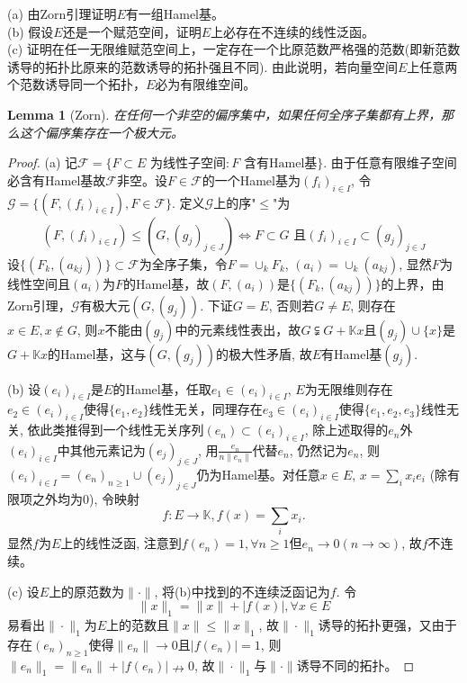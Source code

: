 \documentclass[a4paper,8pt]{ctexart}\textwidth 140mm \textheight 216mm
\newtheorem{Lemma}{Lemma}[section]
\newcommand{\F}{{\mathcal F}}
\newcommand{\8}{\infty}
\begin{document}
\noindent (a) 由Zorn引理证明$E$有一组Hamel基。\\
\noindent (b) 假设$E$还是一个赋范空间，证明$E$上必存在不连续的线性泛函。\\
\noindent (c) 证明在任一无限维赋范空间上，一定存在一个比原范数严格强的范数(即新范数诱导的拓扑比原来的范数诱导的拓扑强且不同). 由此说明，若向量空间$E$上任意两个范数诱导同一个拓扑，$E$必为有限维空间。
\begin{Lemma}[Zorn]
	在任何一个非空的偏序集中，如果任何全序子集都有上界，那么这个偏序集存在一个极大元。
\end{Lemma}
\begin{proof}
	(a) 记$\mathcal{F}=\{F\subset E\text{ 为线性子空间}:F\text{ 含有Hamel基}\}$. 由于任意有限维子空间必含有Hamel基故$\mathcal{F}$非空。设$F\in\mathcal{F}$的一个Hamel基为$(f_i)_{i\in I}$, 令$\mathcal{G}=\{(F,(f_i)_{i\in I}),F\in \mathcal{F}\}$. 定义$\mathcal{G}$上的序"$\leq$"为
	\begin{equation*}
	(F,(f_i)_{i\in I})\leq (G,(g_j)_{j\in J})\Leftrightarrow F\subset G\text{ 且}(f_i)_{i\in I}\subset (g_j)_{j\in J}
	\end{equation*}
	设$\{(F_k, (a_{kj}))\}\subset \F$为全序子集，令$F=\cup_{k}F_k$, $(a_i)=\cup_{k}(a_{kj})$, 显然$F$为线性空间且$(a_i)$为$F$的Hamel基，故$(F,(a_i))$是$\{(F_k, (a_{kj}))\}$的上界，由Zorn引理，$\mathcal{G}$有极大元$(G,(g_j))$. 下证$G=E$, 否则若$G\neq E$, 则存在$x\in E, x\notin G$, 则$x$不能由$(g_j)$中的元素线性表出，故$G\subsetneqq G+\mathbb{K}x$且$(g_j)\cup\{x\}$是$G+\mathbb{K}x$的Hamel基，这与$(G,(g_j))$的极大性矛盾, 故$E$有Hamel基$(g_j)$.
	
	(b) 设$(e_i)_{i\in I}$是$E$的Hamel基，任取$e_1\in(e_i)_{i\in I}$, $E$为无限维则存在$e_2\in(e_i)_{i\in I}$使得$\{e_1,e_2\}$线性无关，同理存在$e_3\in(e_i)_{i\in I}$使得$\{e_1,e_2, e_3\}$线性无关, 依此类推得到一个线性无关序列$(e_n)\subset (e_i)_{i\in I}$, 除上述取得的$e_n$外$(e_i)_{i\in I}$中其他元素记为$(e_j)_{j\in J}$, 用$\frac{e_n}{n\|e_n\|}$代替$e_n$, 仍然记为$e_n$, 则$(e_i)_{i\in I}=(e_n)_{n\geq 1}\cup (e_j)_{j\in J}$仍为Hamel基。对任意$x\in E$, $x=\sum_ix_ie_i$ (除有限项之外均为0), 令映射
	\begin{equation*}
	f:E\to \mathbb{K}, f(x)=\sum_i x_i.
	\end{equation*}
	显然$f$为$E$上的线性泛函, 注意到$f(e_n)=1, \forall n\geq 1$但$e_n\to 0(n\to\infty)$, 故$f$不连续。
	
	(c) 设$E$上的原范数为$\|\cdot\|$, 将(b)中找到的不连续泛函记为$f$. 令
	$$\|x\|_1=\|x\|+|f(x)|,\forall x\in E$$ 易看出$\|\cdot\|_1$为$E$上的范数且$\|x\|\leq \|x\|_1$, 故$\|\cdot\|_1$诱导的拓扑更强，又由于存在$(e_n)_{n\geq 1}$使得$\|e_n\|\to 0$且$|f(e_n)|=1$, 则$\|e_n\|_1=\|e_n\|+|f(e_n)|\nrightarrow 0$, 故$\|\cdot\|_1$与$\|\cdot\|$诱导不同的拓扑。
\end{proof}
\end{document}
